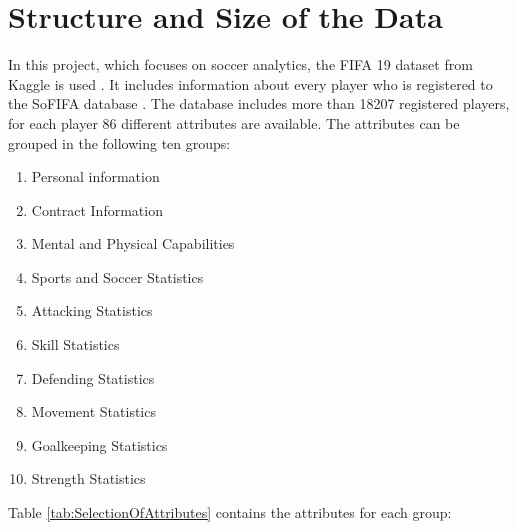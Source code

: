 \documentclass[runningheads]{llncs}
\begin{document}
\section{Structure and Size of the Data}
In this project, which focuses on soccer analytics, the FIFA 19 dataset from Kaggle is used \cite{ref_kaggle}. It includes information about every player who is registered to the SoFIFA database \cite{ref_sofifa}. 
The database includes more than 18207 registered players, for each player 86 different attributes are available. The attributes can be grouped in the following ten groups: 
\begin{multicols}{2}
	\begin{enumerate}
	\item Personal information
	\item Contract Information
	\item Mental and Physical Capabilities
	\item Sports and Soccer Statistics
	\item Attacking Statistics  
	\item Skill Statistics
	\item Defending Statistics
	\item Movement Statistics
	\item Goalkeeping Statistics
	\item Strength Statistics
\end{enumerate}
\end{multicols}

Table \ref{tab:SelectionOfAttributes} contains the attributes for each group:
\end{document}
